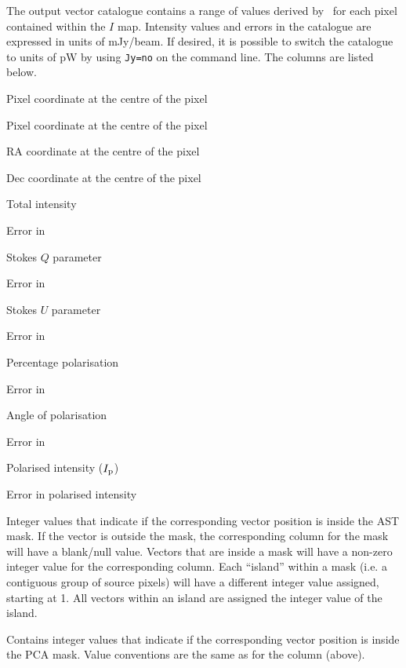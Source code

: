 The output vector catalogue contains a range of values derived by
\poltwomap\ for each pixel contained within the $I$ map. Intensity values and
errors in the
catalogue are expressed in units of mJy/beam.  If desired, it is possible
to switch the catalogue to units of pW by using \texttt{Jy=no} on the 
command line.  The columns are listed below.

\begin{aligndesc}
\item[\catcol{X}] Pixel coordinate at the centre of the pixel
\item[\catcol{Y}] Pixel coordinate at the centre of the pixel
\item[\catcol{RA}] RA coordinate at the centre of the pixel
\item[\catcol{Dec}] Dec coordinate at the centre of the pixel
\item[\catcol{I}] Total intensity
\item[\catcol{DI}] Error in 
\item[\catcol{Q}] Stokes $Q$ parameter
\item[\catcol{DQ}] Error in 
\item[\catcol{U}] Stokes $U$ parameter
\item[\catcol{DU}] Error in 
\item[\catcol{P}] Percentage polarisation
\item[\catcol{DP}] Error in 
\item[\catcol{ANG}] Angle of polarisation
\item[\catcol{DANG}] Error in 
\item[\catcol{PI}] Polarised intensity ($I_{\textnormal{p}}$)
\item[\catcol{DPI}] Error in polarised intensity
\item[\catcol{AST}] Integer values that indicate if the corresponding vector position is inside the
                    AST mask. If the vector is outside the mask, the corresponding column for the
                    mask will have a blank/null value. Vectors that are inside a mask will have a
                    non-zero integer value for the corresponding column. Each ``island'' within a
                    mask (i.e. a contiguous group of source pixels) will have a different integer
                    value assigned, starting at 1. All vectors within an island  are assigned the
                    integer value of the island.
\item[\catcol{PCA}] Contains integer values that indicate if the corresponding vector position is
                    inside the PCA mask. Value conventions are the same as for the 
                    column (above).
\end{aligndesc}


